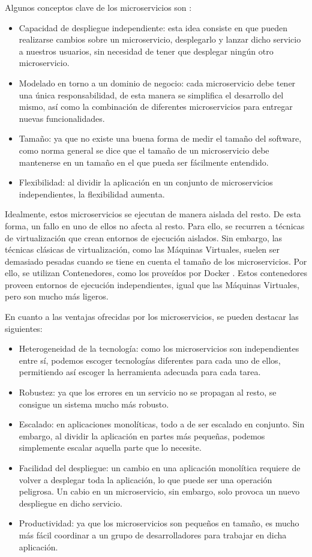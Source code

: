 Algunos conceptos clave de los microservicios son \cite{newman2021building}:
\begin{itemize}
    \item Capacidad de despliegue independiente: esta idea consiste en que pueden realizarse cambios sobre un
        microservicio, desplegarlo y lanzar dicho servicio a nuestros usuarios, sin necesidad de tener que 
        desplegar ningún otro microservicio.
    \item Modelado en torno a un dominio de negocio: cada microservicio debe tener una única responsabilidad, de 
        esta manera se simplifica el desarrollo del mismo, así como la combinación de diferentes
        microservicios para entregar nuevas funcionalidades.
    \item Tamaño: ya que no existe una buena forma de medir el tamaño del software, como norma general
        se dice que el tamaño de un microservicio debe mantenerse en un tamaño en el que pueda ser 
        fácilmente entendido.
    \item Flexibilidad: al dividir la aplicación en un conjunto de microservicios independientes, la flexibilidad
        aumenta.
\end{itemize}

Idealmente, estos microservicios se ejecutan de manera aislada del resto. De esta forma, un fallo en uno de ellos 
no afecta al resto. Para ello, se recurren a técnicas de virtualización que crean entornos de ejecución aislados.
Sin embargo, las técnicas clásicas de virtualización, como las Máquinas Virtuales, suelen ser demasiado pesadas
cuando se tiene en cuenta el tamaño de los microservicios. Por ello, se utilizan Contenedores, como los proveídos 
por Docker \cite{docker-pag}. Estos contenedores proveen entornos de ejecución independientes, igual que las Máquinas 
Virtuales, pero son mucho más ligeros.

En cuanto a las ventajas ofrecidas por los microservicios, se pueden destacar las siguientes:
\begin{itemize}
    \item Heterogeneidad de la tecnología: como los microservicios son independientes entre sí, podemos 
        escoger tecnologías diferentes para cada uno de ellos, permitiendo así escoger la herramienta 
        adecuada para cada tarea.
    \item Robustez: ya que los errores en un servicio no se propagan al resto, se consigue un sistema mucho
        más robusto.
    \item Escalado: en aplicaciones monolíticas, todo a de ser escalado en conjunto. Sin embargo, al dividir 
        la aplicación en partes más pequeñas, podemos simplemente escalar aquella parte que lo necesite.
    \item Facilidad del despliegue: un cambio en una aplicación monolítica requiere de volver a desplegar 
        toda la aplicación, lo que puede ser una operación peligrosa. Un cabio en un microservicio, sin embargo,
        solo provoca un nuevo despliegue en dicho servicio.
    \item Productividad: ya que los microservicios son pequeños en tamaño, es mucho más fácil coordinar a un grupo
        de desarrolladores para trabajar en dicha aplicación.
\end{itemize}
